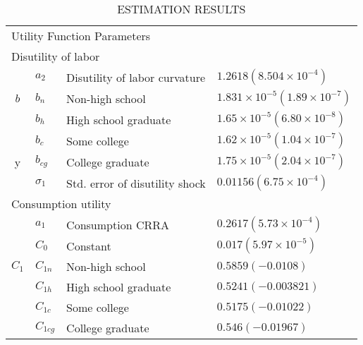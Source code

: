 \documentclass[10pt, letterpaper]{article}
\begin{document}
\begin{longtable}{c l l l}
% 
    \caption{  \label{tab:EstimationResults}\\
      \scriptsize ESTIMATION RESULTS} \\  

  \hline%
    \multicolumn{3}{l}{Utility Function Parameters} & {}  \\
    \multicolumn{4}{l}{\quad Disutility of labor} \\ 
     {} &  $a_2$  & Disutility of labor curvature  & $1.2618 (8.504 \times 10^{-4})$ \\
    $b$ &  $b_n$  &   Non-high school &$1.831 \times 10^{-5} (1.89 \times 10^{-7})$ \\
    {} &   $b_h$  &  High school graduate  & $1.65 \times 10^{-5} (6.80 \times 10^{-8})$ \\
    {} &   $b_c$ &  Some college  & $1.62 \times 10^{-5} (1.04 \times 10^{-7})$ \\y
    {} &   $b_{cg}$  &  College graduate  & $1.75 \times 10^{-5} (2.04 \times 10^{-7})$ \\
    {} &   $\sigma_1$ &  Std. error of disutility shock  & $0.01156 (6.75 \times 10^{-4})$ \\
    \multicolumn{4}{l}{Consumption utility}  \\
    {} &   $a_1 $  &  Consumption CRRA  &$0.2617 (5.73 \times 10^{-4}) $\\
    {} &   $C_0 $ &  Constant  & $0.017 (5.97 \times 10^{-5}) $\\
    $C_1$ &   $C_{1n} $ &   Non-high school  & $0.5859 (-0.0108) $\\
    {} &   $C_{1h} $&  High school graduate  & $0.5241 (-0.003821)$\\
    {} &    $C_{1c} $ &  Some college  & $0.5175 (-0.01022) $\\
    {} &    $C_{1cg} $&  College graduate  &$0.546 (-0.01967) $\\

\end{longtable}
\end{document}
